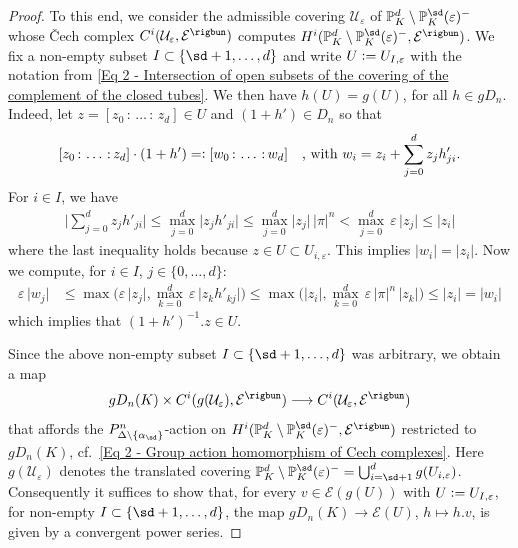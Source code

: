 \documentclass[a4paper, reqno, 10pt]{amsart}
\theoremstyle{definition}
\numberwithin{equation}{section}
\newcommand{\abs}[1]{{\lvert{#1}\rvert}}
\newcommand{\defeq}{\vcentcolon=}
\newcommand{\eqdef}{=\vcentcolon}
\newcommand{\lra}{\longrightarrow}
\newcommand{\mto}{\mapsto}
\newcommand{\ra}{\rightarrow}
\newcommand{\BP}{{\mathbb {P}}}
\newcommand{\CE}{{\mathcal {E}}}
\newcommand{\CU}{{\mathcal {U}}}
\newcommand{\unif}{{\pi}}
\begin{document}
\begin{proof}
	
	To this end, we consider the admissible covering $\CU_{\varepsilon}$ of $\BP_K^d \setminus \BP^\sd_K (\varepsilon)^-$ whose \v{C}ech complex $C^i(\CU_\varepsilon,\CE^\rigbun)$ computes $H^i(\BP^d_K\setminus \BP^\sd_K(\varepsilon)^-,\CE^\rigbun)$.
	We fix a non-empty subset $I\subset \{\sd+1,\ldots,d\}$ and write $U \defeq U_{I,\varepsilon}$ with the notation from \eqref{Eq 2 - Intersection of open subsets of the covering of the complement of the closed tubes}.
	We then have $h(U) = g(U)$, for all $h\in gD_n$. 
	Indeed, let $z=[z_0{\,:\,}\ldots{\,:\,}z_d] \in U$ and $(1+h') \in D_{n}$ so that 
	\[ [z_0{\,:\,}\ldots{\,:\,}z_d] \cdot (1+h') \eqdef [w_0{\,:\,}\ldots{\,:\,}w_d] \quad\text{, with $w_i = z_i + \sum_{j=0}^d z_j h'_{ji}$.} \]
	For $i\in I$, we have 
	\begin{align*}
		\Big\lvert \sum_{j=0}^d z_j h'_{ji} \Big\rvert \leq \max_{j=0}^d \abs{z_j h'_{ji}} \leq \max_{j=0}^d \abs{z_j} \, \abs{\unif}^n < \max_{j=0}^d \,\varepsilon \, \abs{z_j} \leq \abs{z_i}
	\end{align*}
	where the last inequality holds because $z \in U \subset U_{i,\varepsilon}$.
	This implies $\abs{w_i} =\abs{z_i}$.
	Now we compute, for $i\in I$, $ j\in \{0,\ldots,d \}$:
	\begin{align*}
		\varepsilon \,\abs{w_j} &\leq \max \Big( \varepsilon \,\abs{z_j} , \max_{k=0}^{d} \,\varepsilon \,\abs{z_k h'_{kj}} \Big) 
		\leq \max \Big( \abs{z_i} , \max_{k=0}^d \,\varepsilon \,\abs{\unif}^n\, \abs{z_k} \Big) 
		\leq \abs{z_i} = \abs{w_i}
	\end{align*}
	which implies that $(1+h')^{-1}.z \in U$.
	
	
	Since the above non-empty subset $I\subset \{\sd +1,\ldots, d\}$ was arbitrary, we obtain a map
	\begin{equation*}
		gD_n(K) \times C^i(g(\CU_\varepsilon),\CE^\rigbun) \lra C^i(\CU_\varepsilon,\CE^\rigbun)
	\end{equation*}
	that affords the $P^n_{\Delta\setminus \{\alpha_{\sd}\}}$-action on $H^i(\BP^d_K\setminus \BP^\sd_K(\varepsilon)^-,\CE^\rigbun)$ restricted to $gD_n(K)$, cf.\ \eqref{Eq 2 - Group action homomorphism of Cech complexes}.
	Here $g(\CU_{\varepsilon})$ denotes the translated covering $\BP_K^d \setminus \BP^\sd_K (\varepsilon)^- = \bigcup_{i=\sd+1}^d g(U_{i,\varepsilon})$.
	Consequently it suffices to show that, for every $v\in \CE(g(U))$ with $U \defeq U_{I,\varepsilon}$, for non-empty $I\subset \{\sd+1,\ldots,d\}$, the map $gD_n(K) \ra \CE(U)$, $h \mto h.v$, is given by a convergent power series.
	

\end{proof}
\end{document}
